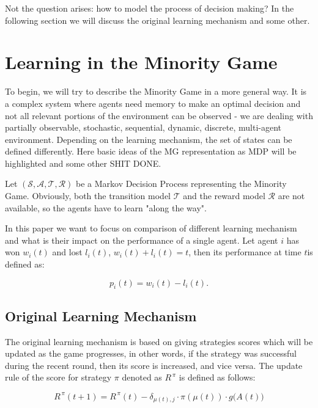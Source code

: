 \documentclass[12pt,american,czech]{article}
\begin{document}
Not the question arises: how to model the process of decision making? In the following section we will discuss the original learning mechanism and some other.

\section{Learning in the Minority Game}

To begin, we will try to describe the Minority Game in a more general way. It is a complex system where agents need memory to make an optimal decision and not all relevant portions of the environment can be observed - we are dealing with partially observable, stochastic, sequential, dynamic, discrete, multi-agent environment. Depending on the learning mechanism, the set of states can be defined differently. Here basic ideas of the MG representation as MDP will be highlighted and some other SHIT DONE.

Let $(\mathcal{S},\mathcal{A},\mathcal{T},\mathcal{R})$ be a Markov Decision Process representing the Minority Game. Obviously, both the transition model $\mathcal{T}$ and the reward model $\mathcal{R}$ are not available, so the agents have to learn "along the way".

In this paper we want to focus on comparison of different learning mechanism and what is their impact on the performance of a single agent. Let agent $i$ has won $w_{i}(t)$ and lost $l_{i}(t)$, $w_{i}(t)+l_{i}(t)=t$, then its performance at time $t$is defined as:

\begin{equation}
p_{i}(t) = w_{i}(t)-l_{i}(t).
\end{equation}

\subsection{Original Learning Mechanism}\label{subsec:original}

The original learning mechanism is based on giving strategies scores which will be updated as the game progresses, in other words, if the strategy was successful during the recent round, then its score is increased, and vice versa. The update rule of the score for strategy $\pi$ denoted as $R^{\,\pi}$ is defined as follows:

\begin{equation} \label{eq:mg_score_upd}
R^{\,\pi}(t+1) = R^{\,\pi}(t)-\delta_{\mu(t),j}\cdot\pi(\mu(t))\cdot g\big(A(t)\big)
\end{equation}
\end{document}
